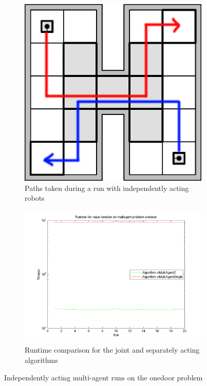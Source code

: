 \documentclass[10pt,a4paper]{article}
\begin{document}
\begin{figure}
        \centering
        \begin{subfigure}{0.4\textwidth}
                \includegraphics[width=\textwidth]{todo/onedoor/path-single.png}
                \caption{Paths taken during a run with independently acting robots}
                \label{fig:single_onedoor_part1}
                \hspace{10pt}
        \end{subfigure}
        \quad
        \begin{subfigure}{0.48\textwidth}
        		\includegraphics[width=\textwidth]{todo/onedoor/timings_vi-2.png}
                \caption{Runtime comparison for the joint and separately acting algorithms}
                \label{fig:single_onedoor_part2}
                \hspace{-10pt}
        \end{subfigure}
        \caption{Independently acting multi-agent runs on the onedoor problem}
        \label{fig:single_onedoor}
\end{figure}
\end{document}
